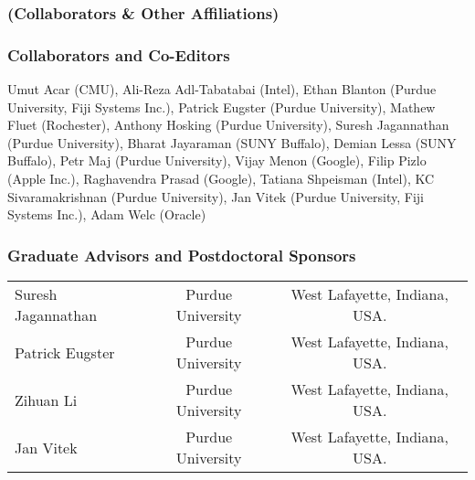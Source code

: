 \documentclass[times,11pt]{article}
\newcommand{\fijisys}{Fiji Systems Inc.}
\begin{document}
\subsubsection*{(Collaborators \& Other Affiliations)}
\subsubsection*{Collaborators and Co-Editors}
\noindent Umut Acar (CMU),
Ali-Reza Adl-Tabatabai (Intel), 
Ethan Blanton (Purdue University, \fijisys),
Patrick Eugster (Purdue University),
Mathew Fluet (Rochester), 
Anthony Hosking (Purdue University),
Suresh Jagannathan (Purdue University),
Bharat Jayaraman (SUNY Buffalo), 
Demian Lessa (SUNY Buffalo),
Petr Maj (Purdue University),
Vijay Menon (Google),
Filip Pizlo (Apple Inc.),
Raghavendra Prasad (Google),
Tatiana Shpeisman (Intel),
KC Sivaramakrishnan (Purdue University),
Jan Vitek (Purdue University, \fijisys),
Adam Welc (Oracle)


\subsubsection*{Graduate Advisors and Postdoctoral Sponsors}
\noindent \begin{tabular}{lcc}
Suresh Jagannathan & Purdue University & West Lafayette, Indiana, USA.\\
Patrick Eugster    & Purdue University & West Lafayette, Indiana, USA.\\
Zihuan Li          & Purdue University & West Lafayette, Indiana, USA.\\
Jan Vitek          & Purdue University & West Lafayette, Indiana, USA.\\
\end{tabular}
\end{document}
